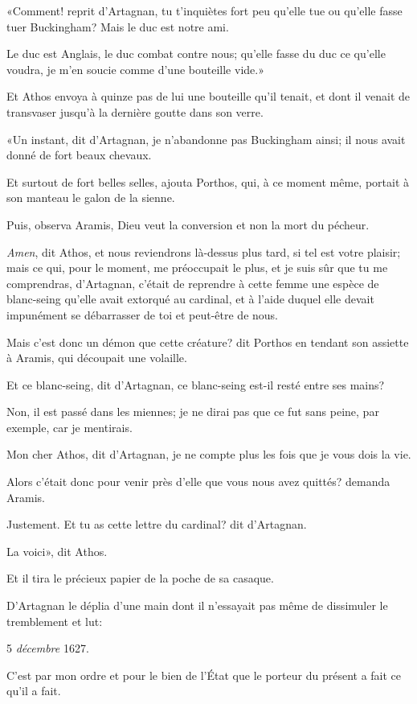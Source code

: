 «Comment! reprit d'Artagnan, tu t'inquiètes fort peu qu'elle tue ou qu'elle fasse tuer Buckingham? Mais le duc est notre ami. 

\speak  Le duc est Anglais, le duc combat contre nous; qu'elle fasse du duc ce qu'elle voudra, je m'en soucie comme d'une bouteille vide.» 

Et Athos envoya à quinze pas de lui une bouteille qu'il tenait, et dont il venait de transvaser jusqu'à la dernière goutte dans son verre. 

«Un instant, dit d'Artagnan, je n'abandonne pas Buckingham ainsi; il nous avait donné de fort beaux chevaux. 

\speak  Et surtout de fort belles selles, ajouta Porthos, qui, à ce moment même, portait à son manteau le galon de la sienne. 

\speak  Puis, observa Aramis, Dieu veut la conversion et non la mort du pécheur. 

\speak  \textit{Amen}, dit Athos, et nous reviendrons là-dessus plus tard, si tel est votre plaisir; mais ce qui, pour le moment, me préoccupait le plus, et je suis sûr que tu me comprendras, d'Artagnan, c'était de reprendre à cette femme une espèce de blanc-seing qu'elle avait extorqué au cardinal, et à l'aide duquel elle devait impunément se débarrasser de toi et peut-être de nous. 

\speak  Mais c'est donc un démon que cette créature? dit Porthos en tendant son assiette à Aramis, qui découpait une volaille. 

\speak  Et ce blanc-seing, dit d'Artagnan, ce blanc-seing est-il resté entre ses mains? 

\speak  Non, il est passé dans les miennes; je ne dirai pas que ce fut sans peine, par exemple, car je mentirais. 

\speak  Mon cher Athos, dit d'Artagnan, je ne compte plus les fois que je vous dois la vie. 

\speak  Alors c'était donc pour venir près d'elle que vous nous avez quittés? demanda Aramis. 

\speak  Justement. Et tu as cette lettre du cardinal? dit d'Artagnan. 

\speak  La voici», dit Athos. 

Et il tira le précieux papier de la poche de sa casaque. 

D'Artagnan le déplia d'une main dont il n'essayait pas même de dissimuler le tremblement et lut: 

\begin{mail}{5 \textit{décembre} 1627.}

C'est par mon ordre et pour le bien de l'État que le porteur du présent a fait ce qu'il a fait.
\end{mail}

